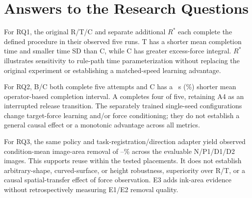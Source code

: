 \FloatBarrier
\section{Answers to the Research Questions}
For RQ1, the original R/T/C and separate additional \(R^{*}\) each complete the defined procedure in their observed five runs. T has a shorter mean completion time and smaller time SD than C, while C has greater excess-force integral. \(R^{*}\) illustrates sensitivity to rule-path time parameterization without replacing the original experiment or establishing a matched-speed learning advantage.

For RQ2, B/C both complete five attempts and C has a \BCSeconds~s (\BCPercent\%) shorter mean operator-based completion interval. A completes four of five, retaining A4 as an interrupted release transition. The separately trained single-seed configurations change target-force learning and/or force conditioning; they do not establish a general causal effect or a monotonic advantage across all metrics.

For RQ3, the same policy and task-registration/direction adapter yield observed condition-mean image-area removal of \EthreeDtwoRemoval--\EthreeNRemoval\% across the evaluable N/P1/D1/D2 images. This supports reuse within the tested placements. It does not establish arbitrary-shape, curved-surface, or height robustness, superiority over R/T, or a causal spatial-transfer effect of force observation. E3 adds ink-area evidence without retrospectively measuring E1/E2 removal quality.
